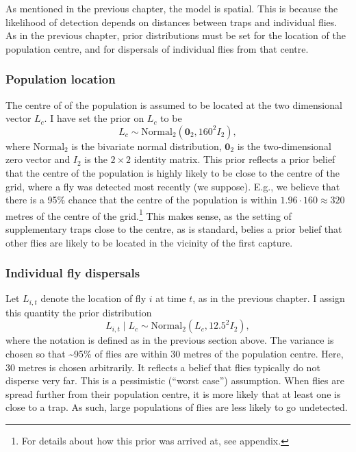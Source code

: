 \documentclass[
  oneside]{book}
\begin{document}
As mentioned in the previous chapter, the model is spatial. This is because the likelihood of detection depends on distances between traps and individual flies. As in the previous chapter, prior distributions must be set for the location of the population centre, and for dispersals of individual flies from that centre.

\hypertarget{population-location}{%
\subsubsection{Population location}\label{population-location}}

The centre of of the population is assumed to be located at the two dimensional vector \(L_c\). I have set the prior on \(L_c\) to be
\[
L_c \sim \mathrm {Normal}_2 (\mathbf 0_2, 160^2 I_2),
\]
where \(\mathrm{Normal}_2\) is the bivariate normal distribution, \(\mathbf 0_2\) is the two-dimensional zero vector and \(I_2\) is the \(2 \times 2\) identity matrix. This prior reflects a prior belief that the centre of the population is highly likely to be close to the centre of the grid, where a fly was detected most recently (we suppose). E.g., we believe that there is a 95\% chance that the centre of the population is within \(1.96 \cdot 160 \approx 320\) metres of the centre of the grid.\footnote{For details about how this prior was arrived at, see appendix.} This makes sense, as the setting of supplementary traps close to the centre, as is standard, belies a prior belief that other flies are likely to be located in the vicinity of the first capture.

\hypertarget{individual-fly-dispersals}{%
\subsubsection{Individual fly dispersals}\label{individual-fly-dispersals}}

Let \(L_{i, t}\) denote the location of fly \(i\) at time \(t\), as in the previous chapter. I assign this quantity the prior distribution \[L_{i, t} \mid L_c \sim \mathrm {Normal}_2 (L_c, 12.5^2 I_2),\] where the notation is defined as in the previous section above. The variance is chosen so that \textasciitilde95\% of flies are within 30 metres of the population centre. Here, 30 metres is chosen arbitrarily. It reflects a belief that flies typically do not disperse very far. This is a pessimistic (``worst case'') assumption. When flies are spread further from their population centre, it is more likely that at least one is close to a trap. As such, large populations of flies are less likely to go undetected.
\end{document}

